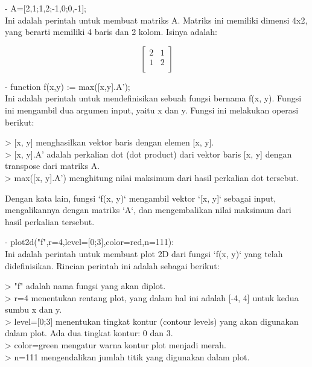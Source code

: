 \documentclass[a4paper,10pt]{article}
\begin{document}
\begin{eulernotebook}
\begin{eulercomment}
\begin{eulercomment}
\begin{eulercomment}
\begin{eulercomment}
\begin{eulercomment}
\begin{eulercomment}
\begin{eulercomment}
\begin{eulercomment}
\begin{eulercomment}
\begin{eulercomment}
\begin{eulercomment}
\begin{eulercomment}
\begin{eulercomment}
- A=[2,1;1,2;-1,0;0,-1];\\
Ini adalah perintah untuk membuat matriks A. Matriks ini memiliki
dimensi 4x2, yang berarti memiliki 4 baris dan 2 kolom. Isinya adalah:\\
\end{eulercomment}
\begin{eulerformula}
\[
\begin {bmatrix} 2 \hspace{10pt} 1 \\ 1 \hspace{10pt} 2 \\ \end{bmatrix}
\]
\end{eulerformula}
\begin{eulercomment}
- function f(x,y) := max([x,y].A');\\
Ini adalah perintah untuk mendefinisikan sebuah fungsi bernama f(x,
y). Fungsi ini mengambil dua argumen input, yaitu x dan y. Fungsi ini
melakukan operasi berikut:

\textgreater{} [x, y] menghasilkan vektor baris dengan elemen [x, y].\\
\textgreater{} [x, y].A' adalah perkalian dot (dot product) dari vektor baris [x,
y] dengan transpose dari matriks A.\\
\textgreater{} max([x, y].A') menghitung nilai maksimum dari hasil perkalian dot
tersebut.

Dengan kata lain, fungsi `f(x, y)` mengambil vektor `[x, y]` sebagai
input, mengalikannya dengan matriks `A`, dan mengembalikan nilai
maksimum dari hasil perkalian tersebut.

- plot2d("f",r=4,level=[0;3],color=red,n=111):\\
Ini adalah perintah untuk membuat plot 2D dari fungsi `f(x, y)` yang
telah didefinisikan. Rincian perintah ini adalah sebagai berikut:

\textgreater{} "f" adalah nama fungsi yang akan diplot.\\
\textgreater{} r=4 menentukan rentang plot, yang dalam hal ini adalah [-4, 4] untuk
kedua sumbu x dan y.\\
\textgreater{} level=[0;3] menentukan tingkat kontur (contour levels) yang akan
digunakan dalam plot. Ada dua tingkat kontur: 0 dan 3.\\
\textgreater{} color=green mengatur warna kontur plot menjadi merah.\\
\textgreater{} n=111 mengendalikan jumlah titik yang digunakan dalam plot.


\end{eulercomment}
\end{eulercomment}
\end{eulercomment}
\end{eulercomment}
\end{eulercomment}
\end{eulercomment}
\end{eulercomment}
\end{eulercomment}
\end{eulercomment}
\end{eulercomment}
\end{eulercomment}
\end{eulercomment}
\end{eulercomment}
\end{eulernotebook}
\end{document}
